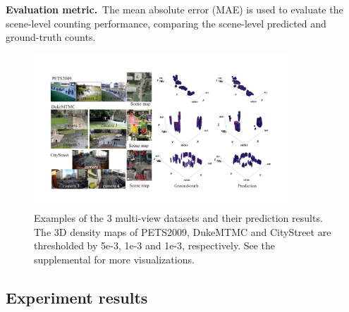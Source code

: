 \documentclass[letterpaper]{article} %
\newcommand{\zq}[1]{\textcolor{black}{#1}} %
\begin{document}
\textbf{Evaluation metric.}~The mean absolute error (MAE) is used to evaluate the scene-level counting performance, comparing the scene-level predicted and ground-truth counts.


\begin{figure}[t]
\centering
   \includegraphics[width=0.85\textwidth]{Fig_results.pdf}
   \caption{Examples of the 3 multi-view datasets and their prediction results.
   The 3D density maps of PETS2009, DukeMTMC and CityStreet are thresholded by 5e-3, 1e-3 and 1e-3, respectively.
   See the supplemental for more visualizations.}
\label{fig:results}
\end{figure}




\subsection{Experiment results}
\end{document}
